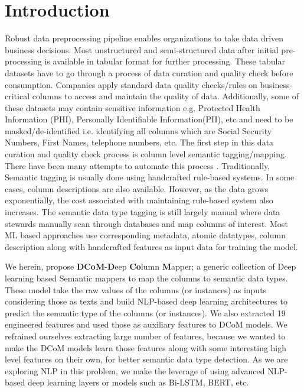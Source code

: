 \documentclass{article}
\begin{document}
\section{Introduction}
Robust data preprocessing pipeline enables organizations to take data driven business decisions. Most unstructured and semi-structured data after initial pre-processing is available in tabular format for further processing. These tabular datasets have to go through a process of data curation and quality check before consumption. Companies apply standard data quality checks/rules on business-critical columns to access and maintain the quality of data. Additionally, some of these datasets may contain sensitive information e.g.  Protected Health Information (PHI), Personally Identifiable Information(PII), etc and need to be masked/de-identified i.e. identifying all columns which are Social Security Numbers, First Names, telephone numbers, etc. The first step in this data curation and quality check process is column level semantic tagging/mapping. There have been many attempts to automate this process \cite{powerbi, Ramnandan, Limaye, Puranik2012ASA, Hulsebos, sato}. 
Traditionally, Semantic tagging is usually done using handcrafted rule-based systems\cite{google, powerbi, Trifacta}. In some cases, column descriptions are also available. However, as the data grows exponentially, the cost associated with maintaining rule-based system also increases. The semantic data type tagging is still largely manual where data stewards manually scan through databases and map columns of interest.
Most ML based approaches \cite{sato, Hulsebos, Pham} use corresponding metadata, atomic datatypes, column description along with handcrafted features as input data for training the model.

We herein, propose \textbf{DCoM}-\textbf{D}eep \textbf{Co}lumn \textbf{M}apper; a generic collection of Deep learning based Semantic mappers to map the columns to semantic data types.
These model take the raw values of the columns (or instances) as inputs considering those as texts and build  NLP-based deep learning architectures to predict the semantic type of the columns (or instances). We also extracted 19 engineered features and used those as auxiliary features to DCoM models. We refrained ourselves extracting large number of features, because we wanted to make the DCoM models learn those features along with some interesting high level features on their own, for better semantic data type detection. As we are exploring NLP in this problem, we make the leverage of using advanced NLP-based deep learning layers or models such as Bi-LSTM, BERT, etc. 
\end{document}
